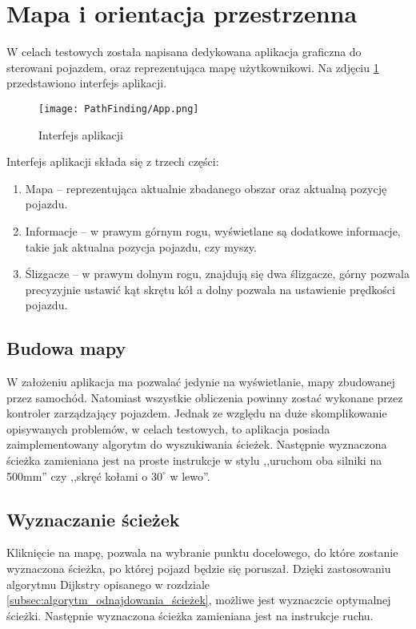 \section{Mapa i orientacja przestrzenna}
    W celach testowych została napisana dedykowana aplikacja graficzna do sterowani pojazdem, oraz reprezentująca mapę użytkownikowi.
    Na zdjęciu \ref{fig:app} przedstawiono interfejs aplikacji.
    \begin{figure}[!ht]
        \centering
        \texttt{[image: PathFinding/App.png]}
        \caption{Interfejs aplikacji}
        \label{fig:app}
    \end{figure}
    Interfejs aplikacji składa się z trzech części:
    \begin{enumerate}
        \item Mapa -- reprezentująca aktualnie zbadanego obszar oraz aktualną pozycję pojazdu.
        \item Informacje -- w prawym górnym rogu, wyświetlane są dodatkowe informacje, takie jak aktualna pozycja pojazdu, czy myszy.
        \item Ślizgacze -- w prawym dolnym rogu, znajdują się dwa ślizgacze, górny pozwala precyzyjnie ustawić kąt skrętu kół a dolny pozwala na ustawienie prędkości pojazdu.
    \end{enumerate}

    \subsection{Budowa mapy}
        W założeniu aplikacja ma pozwalać jedynie na wyświetlanie, mapy zbudowanej przez samochód.
        Natomiast wszystkie obliczenia powinny zostać wykonane przez kontroler zarządzający pojazdem.
        Jednak ze względu na duże skomplikowanie opisywanych problemów, w celach testowych, to aplikacja posiada zaimplementowany algorytm do wyszukiwania ścieżek.
        Następnie wyznaczona ścieżka zamieniana jest na proste instrukcje w stylu ,,uruchom oba silniki na 500mm'' czy ,,skręć kołami o $30^\circ$ w lewo''.
        



    \subsection{Wyznaczanie ścieżek}
        Kliknięcie na mapę, pozwala na wybranie punktu docelowego, do które zostanie wyznaczona ścieżka, po której pojazd będzie się poruszał.
        Dzięki zastosowaniu algorytmu Dijkstry opisanego w rozdziale \ref{subsec:algorytm_odnajdowania_ścieżek}, możliwe jest wyznaczcie optymalnej ścieżki.
        Następnie wyznaczona ścieżka zamieniana jest na instrukcje ruchu.

